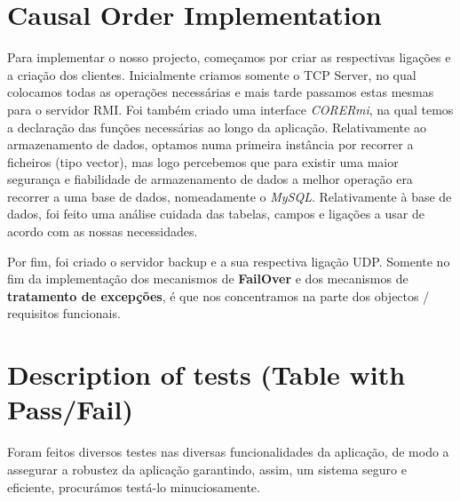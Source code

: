 \documentclass[12pt]{article} %
\begin{document}
\section{Causal Order Implementation}
\label{sec:causal}
Para implementar o nosso projecto, começamos por criar as respectivas ligações e a criação dos clientes. Inicialmente criamos somente o TCP Server, no qual colocamos todas as operações necessárias e mais tarde passamos estas mesmas para o servidor RMI. Foi também criado uma interface \emph{CORERmi}, na qual temos a declaração das funções necessárias ao longo da aplicação.
Relativamente ao armazenamento de dados, optamos numa primeira instância por recorrer a ficheiros (tipo vector), mas logo percebemos que para existir uma maior segurança e fiabilidade de armazenamento de dados a melhor operação era recorrer a uma base de dados, nomeadamente o \emph{MySQL}. Relativamente à base de dados, foi feito uma análise cuidada das tabelas, campos e ligações a usar de acordo com as nossas necessidades.

Por fim, foi criado o servidor backup e a sua respectiva ligação UDP. Somente no fim da implementação dos mecanismos de \textbf{FailOver} e dos mecanismos de \textbf{tratamento de excepções}, é que nos concentramos na parte dos objectos / requisitos funcionais.


\pagebreak
\section{Description of tests (Table with Pass/Fail)} %
\label{sec:Tests}
Foram feitos diversos testes nas diversas funcionalidades da aplicação, de modo a assegurar a robustez da aplicação garantindo, assim, um sistema seguro e eficiente, procurámos testá-lo minuciosamente.

\end{document}
